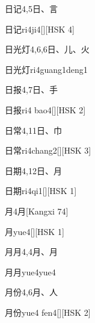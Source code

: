\begin{entry}{日记}{4,5}{⽇、⾔}
  \begin{phonetics}{日记}{ri4ji4}[][HSK 4]
  \end{phonetics}
\end{entry}

\begin{entry}{日光灯}{4,6,6}{⽇、⼉、⽕}
  \begin{phonetics}{日光灯}{ri4guang1deng1}
  \end{phonetics}
\end{entry}

\begin{entry}{日报}{4,7}{⽇、⼿}
  \begin{phonetics}{日报}{ri4 bao4}[][HSK 2]
  \end{phonetics}
\end{entry}

\begin{entry}{日常}{4,11}{⽇、⼱}
  \begin{phonetics}{日常}{ri4chang2}[][HSK 3]
  \end{phonetics}
\end{entry}

\begin{entry}{日期}{4,12}{⽇、⽉}
  \begin{phonetics}{日期}{ri4qi1}[][HSK 1]
  \end{phonetics}
\end{entry}

\begin{entry}{月}{4}{⽉}[Kangxi 74]
  \begin{phonetics}{月}{yue4}[][HSK 1]
  \end{phonetics}
\end{entry}

\begin{entry}{月月}{4,4}{⽉、⽉}
  \begin{phonetics}{月月}{yue4yue4}
  \end{phonetics}
\end{entry}

\begin{entry}{月份}{4,6}{⽉、⼈}
  \begin{phonetics}{月份}{yue4 fen4}[][HSK 2]
  \end{phonetics}
\end{entry}

